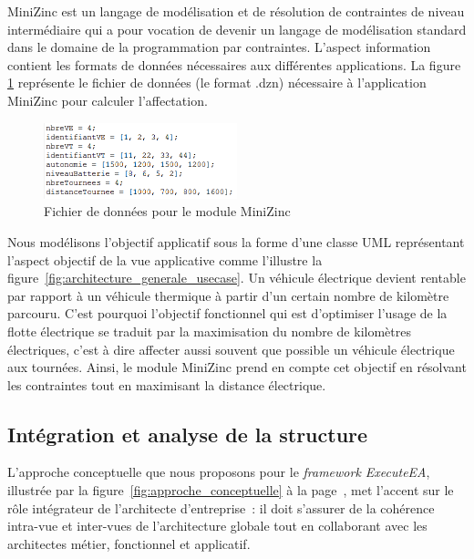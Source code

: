 MiniZinc est un langage de modélisation et de résolution de contraintes de
niveau intermédiaire qui a pour vocation de devenir un langage de modélisation
standard dans le domaine de la programmation par contraintes. L'aspect
information contient les formats de données nécessaires aux différentes
applications. La figure \ref{fig:formatMiniZinc} représente le fichier de
données (le format .dzn) nécessaire à l'application MiniZinc pour calculer
l'affectation.

\begin{figure}[!htbp]
 \begin{center}
  \includegraphics[width=0.5\textwidth]{figures/5_implementation/format_minizinc.png}
 \end{center}
 \caption{Fichier de données pour le module MiniZinc}
 \label{fig:formatMiniZinc}
\end{figure} 

Nous modélisons l'objectif applicatif sous la forme d'une classe UML
représentant l'aspect objectif de la vue applicative comme l'illustre la
figure~\ref{fig:architecture_generale_usecase}. Un véhicule électrique devient
rentable par rapport à un véhicule thermique à partir d'un certain nombre de
kilomètre parcouru. C'est pourquoi l'objectif fonctionnel qui est d'optimiser
l'usage de la flotte électrique se traduit par la maximisation du nombre de
kilomètres électriques, c'est à dire affecter aussi souvent que possible un
véhicule électrique aux tournées. Ainsi, le module MiniZinc prend en compte cet
objectif en résolvant les contraintes tout en maximisant la distance électrique.



\subsection{Intégration et analyse de la structure}

L'approche conceptuelle que nous proposons pour le \emph{framework ExecuteEA},
illustrée par la figure~\ref{fig:approche_conceptuelle} à la
page~\pageref{fig:approche_conceptuelle}, met l'accent sur le rôle intégrateur
de l'architecte d'entreprise~: il doit s'assurer de la cohérence intra-vue et
inter-vues de l'architecture globale tout en collaborant avec les architectes
métier, fonctionnel et applicatif.

